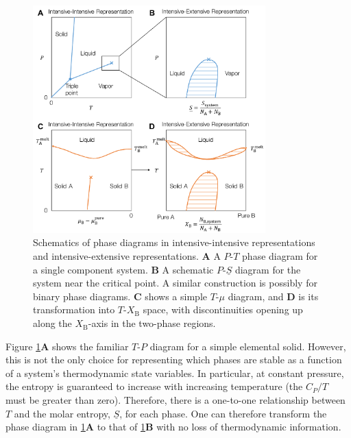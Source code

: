 \documentclass[12pt]{article}
\begin{document}
\begin{figure}[!h]
\centering
\includegraphics[width=0.8\textwidth]{Intensive_extensive_phase_diagrams}
\caption{Schematics of phase diagrams in intensive-intensive representations and intensive-extensive representations. \textbf{A} A \(P\)-\(T\) phase diagram for a single component system. \textbf{B} A schematic \(P\)-\(\underline{S}\) diagram for the system near the critical point. A similar construction is possibly for binary phase diagrams. \textbf{C} shows a simple $T$-$\mu$ diagram, and \textbf{D} is its transformation into $T$-$X_\text{B}$ space, with discontinuities opening up along the $X_\text{B}$-axis in the two-phase regions.}
\label{fig:Intensive_extensive_phase_diagrams}
\end{figure}

Figure \ref{fig:Intensive_extensive_phase_diagrams}\textbf{A} shows the familiar $T$-$P$ diagram for a simple elemental solid. However, this is not the only choice for representing which phases are stable as a function of a system's thermodynamic state variables. In particular, at constant pressure, the entropy is guaranteed to increase with increasing temperature (the \(C_P/T\) must be greater than zero). Therefore, there is a one-to-one relationship between $T$ and the molar entropy, $\underline{S}$, for each phase. One can therefore transform the phase diagram in \ref{fig:Intensive_extensive_phase_diagrams}\textbf{A} to that of \ref{fig:Intensive_extensive_phase_diagrams}\textbf{B} with no loss of thermodynamic information. \par
\end{document}
